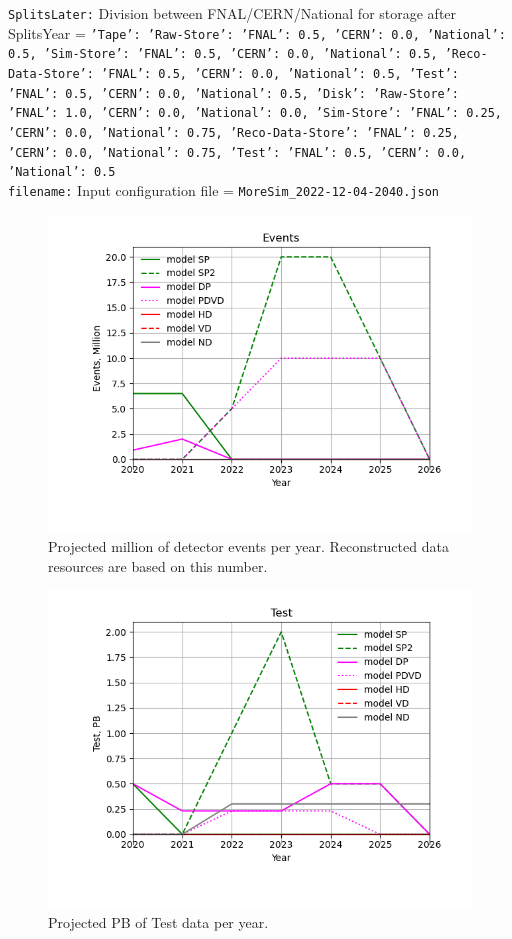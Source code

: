 {\tt SplitsLater:} Division between FNAL/CERN/National for storage after SplitsYear = {\tt {'Tape': {'Raw-Store': {'FNAL': 0.5, 'CERN': 0.0, 'National': 0.5}, 'Sim-Store': {'FNAL': 0.5, 'CERN': 0.0, 'National': 0.5}, 'Reco-Data-Store': {'FNAL': 0.5, 'CERN': 0.0, 'National': 0.5}, 'Test': {'FNAL': 0.5, 'CERN': 0.0, 'National': 0.5}}, 'Disk': {'Raw-Store': {'FNAL': 1.0, 'CERN': 0.0, 'National': 0.0}, 'Sim-Store': {'FNAL': 0.25, 'CERN': 0.0, 'National': 0.75}, 'Reco-Data-Store': {'FNAL': 0.25, 'CERN': 0.0, 'National': 0.75}, 'Test': {'FNAL': 0.5, 'CERN': 0.0, 'National': 0.5}}}} \\
{\tt filename:} Input configuration file = {\tt MoreSim\_2022-12-04-2040.json} \\
\begin{figure}[h]
\centering\includegraphics[height=0.4\textwidth]{MoreSim_2022-12-04-2026/MoreSim_2022-12-04-2026-Events.png}
\caption{Projected million of detector events per year.  Reconstructed data resources are based on this number.}
\label{fig:Events}
\end{figure}
\begin{figure}[h]
\centering\includegraphics[height=0.4\textwidth]{MoreSim_2022-12-04-2026/MoreSim_2022-12-04-2026-Test.png}
\caption{Projected PB of Test data per year.}
\label{fig:Test}
\end{figure}
